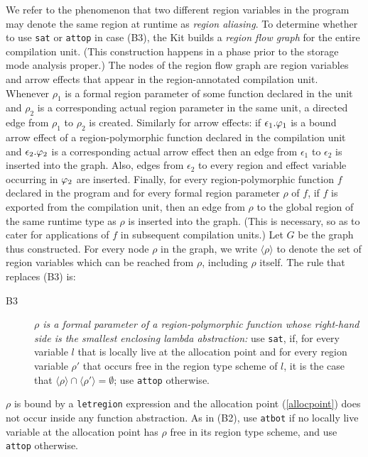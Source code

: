 \documentclass[12pt]{book}
\begin{document}
We refer to the phenomenon that two different region variables in the
program may denote the same region at runtime as 
%
{\em region aliasing}. To determine whether to use {\tt sat}
or {\tt attop} in case (B3), the Kit builds a \label{region flow graph}{\em region flow graph\/} for the
entire compilation unit. (This construction happens in a phase prior to the storage
mode analysis proper.)  The nodes of the region flow graph are region
variables and arrow effects that appear in the region-annotated
compilation unit.  Whenever $\rho_1$ is a formal region parameter of
some function declared in the unit and $\rho_2$ is a corresponding
actual region parameter in the same unit, a directed edge from
$\rho_1$ to $\rho_2$ is created. Similarly for arrow effects: if
$\epsilon_1.\varphi_1$ is a bound arrow effect of a region-polymorphic
function declared in the compilation unit and $\epsilon_2.\varphi_2$ is a
corresponding actual arrow effect then an edge from $\epsilon_1$ to
$\epsilon_2$ is inserted into the graph.  Also, edges from
$\epsilon_2$ to every region and effect variable occurring in $\varphi_2$
are inserted. Finally, for every region-polymorphic function $f$
declared in the program and for every formal region parameter $\rho$ of
$f$, if $f$ is exported from the compilation unit, then an edge from
$\rho$ to the global region of the same runtime type as $\rho$ is
inserted into the graph. (This is necessary, so as to cater for
applications of $f$ in subsequent compilation units.)  Let $G$ be
the graph thus constructed. For every node $\rho$ in the graph, we
write $\langle\rho\rangle$ to denote the set of region variables which
can be reached from $\rho$, including $\rho$ itself. The rule that
replaces (B3) is:
\begin{description}
\item[B3]{\it $\rho$ is a formal parameter of a region-polymorphic function
      whose right-hand side is the smallest enclosing lambda abstraction:}
      use {\tt sat}, if, for every variable $l$ that is locally live 
      at the allocation point and for every region variable $\rho'$
      that occurs free in the region type scheme of $l$, it
      is the case that $\langle\rho\rangle\cap\langle\rho'\rangle =\emptyset$;
      use {\tt attop} otherwise.
\end{description}
\medskip

 $\rho$ is bound by a {\tt letregion} expression
and the allocation point (\ref{allocpoint})
does not occur inside any function abstraction.
As in (B2), use {\tt atbot} if no locally live
variable at the allocation point has $\rho$ free in its region 
type scheme, and use {\tt attop} otherwise.
\end{document}
